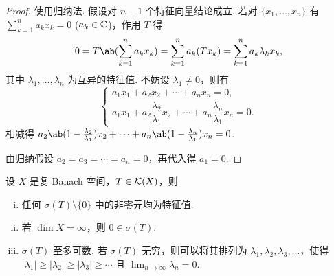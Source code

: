 \begin{proof}
使用归纳法. 假设对 $n-1$ 个特征向量结论成立. 若对 $\{x_1,\dots,x_n\}$ 有 $\sum_{k=1}^n a_k x_k = 0$ ($a_k \in \mathbb{C}$)，作用 $T$ 得
\begin{equation*}
0 = T\ab(\sum_{k=1}^n a_k x_k) = \sum_{k=1}^n a_k (Tx_k) = \sum_{k=1}^n a_k \lambda_k x_k,
\end{equation*}
其中 $\lambda_1,\dots,\lambda_n$ 为互异的特征值. 不妨设 $\lambda_1 \neq 0$，则有
\begin{equation*}
\begin{cases}
a_1 x_1 + a_2 x_2 + \cdots + a_n x_n = 0,\\[2pt]
a_1 x_1 + a_2 \dfrac{\lambda_2}{\lambda_1} x_2 + \cdots + a_n \dfrac{\lambda_n}{\lambda_1} x_n = 0.
\end{cases}
\end{equation*}
相减得 $a_2\ab(1-\frac{\lambda_2}{\lambda_1})x_2 + \cdots + a_n\ab(1-\frac{\lambda_n}{\lambda_1})x_n = 0$. \par
由归纳假设 $a_2 = a_3 = \cdots = a_n = 0$，再代入得 $a_1 = 0$.
\end{proof}

\begin{theorem}[紧算子的谱]\label{thm:compact-spectrum}
设 $X$ 是复 Banach 空间，$T \in \mathcal{K}(X)$，则
\begin{enumerate}[(i)]
    \item 任何 $\sigma(T)\setminus\{0\}$ 中的非零元均为特征值.
    \item 若 $\dim X = \infty$，则 $0 \in \sigma(T)$.
    \item $\sigma(T)$ 至多可数. 若 $\sigma(T)$ 无穷，则可以将其排列为 $\lambda_1, \lambda_2, \lambda_3, \dots$，使得 $|\lambda_1| \geq |\lambda_2| \geq |\lambda_3| \geq \cdots$ 且 $\lim_{n \to \infty} \lambda_n = 0$.
\end{enumerate}
\end{theorem}

